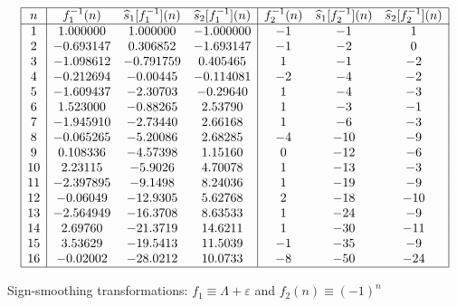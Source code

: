 \documentclass[12pt,reqno,a4letter]{article}
\numberwithin{figure}{section}
\numberwithin{table}{section}
\numberwithin{equation}{section}
\theoremstyle{plain}
\numberwithin{theorem}{section}
\theoremstyle{definition}
\begin{document}
\begin{table}[h!]
\begin{equation*}
\begin{array}{|c|ccc|ccc|} 
 \hline
 n & f_1^{-1}(n) & \widehat{s}_1[f_1^{-1}](n) & \widehat{s}_2[f_1^{-1}](n) & 
     f_2^{-1}(n) & \widehat{s}_1[f_2^{-1}](n) & 
     \widehat{s}_2[f_2^{-1}](n) \\ \hline
 1 & 1.000000 & 1.000000 & -1.000000 & -1 & -1 & 1 \\
 2 & -0.693147 & 0.306852 & -1.693147 & -1 & -2 & 0 \\
 3 & -1.098612 & -0.791759 & 0.405465 & 1 & -1 & -2 \\
 4 & -0.212694 & -0.00445 & -0.114081 & -2 & -4 & -2 \\
 5 & -1.609437 & -2.30703 & -0.29640 & 1 & -4 & -3 \\
 6 & 1.523000 & -0.88265 & 2.53790 & 1 & -3 & -1 \\
 7 & -1.945910 & -2.73440 & 2.66168 & 1 & -6 & -3 \\
 8 & -0.065265 & -5.20086 & 2.68285 & -4 & -10 & -9 \\
 9 & 0.108336 & -4.57398 & 1.15160 & 0 & -12 & -6 \\
 10 & 2.23115 & -5.9026 & 4.70078 & 1 & -13 & -3 \\
 11 & -2.397895 & -9.1498 & 8.24036 & 1 & -19 & -9 \\
 12 & -0.06049 & -12.9305 & 5.62768 & 2 & -18 & -10 \\
 13 & -2.564949 & -16.3708 & 8.63533 & 1 & -24 & -9 \\
 14 & 2.69760 & -21.3719 & 14.6211 & 1 & -30 & -11 \\
 15 & 3.53629 & -19.5413 & 11.5039 & -1 & -35 & -9 \\
 16 & -0.02002 & -28.0212 & 10.0733 & -8 & -50 & -24 \\
 \hline
\end{array}
\end{equation*}
\caption{Sign-smoothing transformations: $f_1 \equiv \Lambda + \varepsilon$ and $f_2(n) \equiv (-1)^n$}
\label{table_s12fn_SignSmoothingTF_v4}
\end{table}
\end{document}
